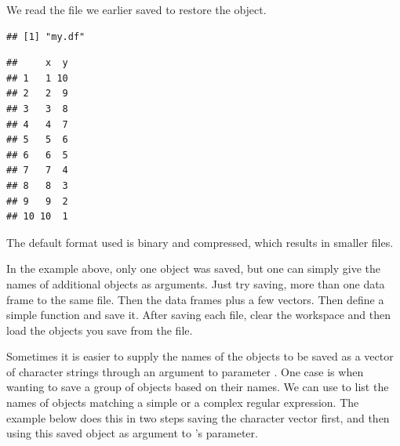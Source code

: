 \documentclass[krantz2,ChapterTOCs]{krantz}\usepackage{knitr}
\begin{document}
We read the file we earlier saved to restore the object.
\begin{knitrout}\footnotesize
{}\color{fgcolor}\begin{kframe}
\begin{alltt}
\hlstd{(} \hlstd{=} \hlstd{)}
\hlstd{(} \hlstd{=} \hlstd{)}
\end{alltt}
\begin{verbatim}
## [1] "my.df"
\end{verbatim}
\begin{alltt}
\end{alltt}
\begin{verbatim}
##     x  y
## 1   1 10
## 2   2  9
## 3   3  8
## 4   4  7
## 5   5  6
## 6   6  5
## 7   7  4
## 8   8  3
## 9   9  2
## 10 10  1
\end{verbatim}
\end{kframe}
\end{knitrout}

The default format used is binary and compressed, which results in smaller files.

\begin{playground}
In the example above, only one object was saved, but one can simply give the names of additional objects as arguments. Just try saving, more than one data frame to the same file. Then the data frames plus a few vectors. Then define a simple function and save it. After saving each file, clear the workspace and then load the objects you save from the file.
\end{playground}

Sometimes it is easier to supply the names of the objects to be saved as a vector of character strings through an argument to parameter . One case is when wanting to save a group of objects based on their names. We can use  to list the names of objects matching a simple  or a complex regular expression. The example below does this in two steps saving the character vector first, and then using this saved object as argument to 's  parameter.

\begin{knitrout}\footnotesize
{}\color{fgcolor}\begin{kframe}
\begin{alltt}
 \hlkwb{<-} \hlstd{(} \hlstd{=} \hlstd{)}
\hlstd{(}   \hlstd{=} \hlstd{)}
\end{alltt}
\end{kframe}
\end{knitrout}
\end{document}

